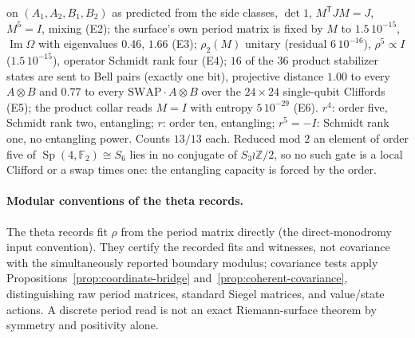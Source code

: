 \documentclass[11pt]{article}
\theoremstyle{definition}
\theoremstyle{remark}
\newcommand{\Z}{\mathbb{Z}}
\newcommand{\Sp}{\operatorname{Sp}}
\begin{document}
\begin{itemize}
on $(A_1,A_2,B_1,B_2)$ as predicted from the side classes, $\det 1$,
$M^{\mathsf T}JM = J$, $M^5 = I$, mixing (E2); the surface's own period
matrix is fixed by $M$ to $1.5\,10^{-15}$, $\operatorname{Im}\Omega$ with
eigenvalues $0.46$, $1.66$ (E3); $\rho_2(M)$ unitary (residual $6\,10^{-16}$),
$\rho^5\propto I$ ($1.5\,10^{-15}$), operator Schmidt rank four (E4); $16$
of the $36$ product stabilizer states are sent to Bell pairs (exactly one
bit), projective distance $1.00$ to every $A\otimes B$ and $0.77$ to every
$\mathrm{SWAP}\cdot A\otimes B$ over the $24\times24$ single-qubit Cliffords
(E5); the product collar reads $M = I$ with entropy $5\,10^{-29}$ (E6).
$r^4$: order five, Schmidt rank two, entangling; $r$: order ten, entangling;
$r^5 = -I$: Schmidt rank one, no entangling power. Counts $13/13$ each.
Reduced mod $2$ an element of order five of $\Sp(4,\mathbb F_2)\cong S_6$
lies in no conjugate of $S_3\wr\Z/2$, so no such gate is a local Clifford
or a swap times one: the entangling capacity is forced by the order.
\end{itemize}

\paragraph{Modular conventions of the theta records.}
The theta records fit $\rho$ from the period matrix directly (the
direct-monodromy input convention). They certify the recorded fits and
witnesses, not covariance with the simultaneously reported boundary
modulus; covariance tests apply Propositions~\ref{prop:coordinate-bridge}
and~\ref{prop:coherent-covariance}, distinguishing raw period matrices,
standard Siegel matrices, and value/state actions. A discrete period read
is not an exact Riemann-surface theorem by symmetry and positivity alone.
\end{document}
